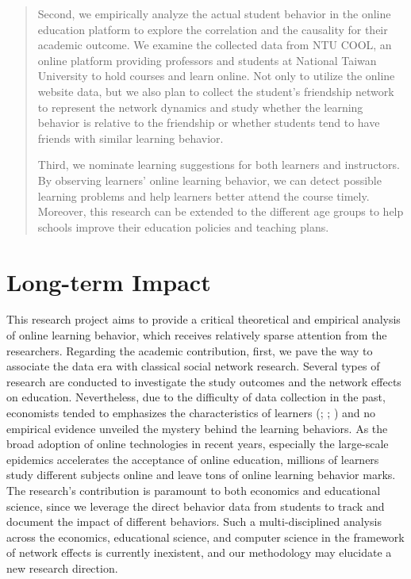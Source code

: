 \documentclass[a4paper]{article}
\theoremstyle{plain}
\begin{document}
\begin{abstract}
    Second, we empirically analyze the actual student behavior in the online
    education platform to explore the correlation 
    and the causality for their academic outcome.
    We examine the collected data from NTU COOL,
    an online platform providing professors and students 
    at National Taiwan University to hold courses and learn online.
    Not only to utilize the online website data, but we also plan to collect the 
    student's friendship network to represent the network dynamics and
    study whether the learning behavior is relative
    to the friendship or whether students tend to have friends 
    with similar learning behavior.

    Third, we nominate learning suggestions for both learners and instructors. By
    observing learners' online learning behavior, we can detect possible learning problems
    and help learners better attend the course timely.
    Moreover, this research can be extended to the different age groups to 
    help schools improve their education policies and teaching plans.
\end{abstract}

\newpage

\section*{Long-term Impact}
This research project aims to provide a critical theoretical and empirical 
analysis of online learning behavior, which receives relatively sparse attention
from the researchers.
Regarding the academic contribution, first, we pave the way to 
associate the data era with classical social network research.
Several types of research are conducted to investigate the study outcomes
and the network effects on education.
Nevertheless, due to the difficulty of data collection
in the past, economists tended to emphasizes the characteristics of learners
(\citet{eduPeer}; \citet{idenEduPeer}; \citet{eduPeerBook}) and
no empirical evidence unveiled the mystery behind the learning behaviors.
As the broad adoption of online technologies in recent years, especially
the large-scale epidemics accelerates the acceptance of online education,
millions of learners study different subjects online and leave tons of
online learning behavior marks.
The research's contribution is paramount to both economics and 
educational science, since we leverage the direct behavior data from students
to track and document the impact of different behaviors.
Such a multi-disciplined analysis across the economics, educational science, and computer
science in the framework of network effects is 
currently inexistent, and our methodology may elucidate a new research direction.
\end{document}
